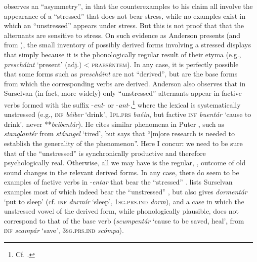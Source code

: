 \documentclass[output=paper,
modfonts
]{LSP/langsci}
\begin{document}
\citet[15]{anderson2013stem} observes an ``asymmetry'', in that the counterexamples
to his claim all involve the appearance of a ``stressed''  that does
not bear stress, while no examples exist in which an ``unstressed'' 
appears under stress. But this is not proof that that the 
alternants are sensitive to stress. On such evidence as Anderson
presents (and from \citealt{signorell2001a}), the small inventory of possibly
derived forms involving a stressed  displays that  simply
because it is the phonologically regular result of their etyma (e.g.,
\emph{prescháint} `present' (adj.) \textless{} \textsc{praeséntem}). In
any case, it is perfectly possible that some forms such as
\emph{prescháint} are not ``derived'', but are the base forms from which
the corresponding verbs are derived. Anderson also observes \citeyear[18]{anderson2013stem}
that in Surselvan (in fact, more widely) only ``unstressed'' 
alternants appear in factive verbs formed with the suffix -\emph{ent}-
or -\emph{ant}-,\footnote{Cf. \citet[103f.]{signorell1987a}.} where the
lexical  is systematically unstressed (e.g., \textsc{inf}
\emph{béiber} `drink', \textsc{1pl.prs} \emph{buéin}, but factive
\textsc{inf} \emph{buentár} `cause to drink', never **\emph{beibentár}).
He cites similar phenomena in Puter \citep[10]{anderson2013stem}, such as
\emph{stanglantér} from \emph{stáungel} `tired', but says that
``{[}m{]}ore research is needed to establish the generality of the
phenomenon''. Here I concur: we need to be sure that  of the
``unstressed''  is synchronically productive and therefore
psychologically real. Otherwise, all we may have is the regular,
, outcome of old sound changes in the relevant derived forms.
In any case, there do seem to be examples of factive verbs in
-\emph{entar} that bear the ``stressed''  . \citet[291f.]{jaberg1939a} lists Surselvan examples most of which indeed bear the
``unstressed'' , but also gives \emph{dormentár} `put to sleep'
(cf. \textsc{inf} \emph{durmír} `sleep', \textsc{1sg.prs.ind}
\emph{dorm}), and a case in which the unstressed vowel of the derived
form, while phonologically plausible, does not correspond to that of the
base verb (\emph{scumpentár} `cause to be saved, heal', from
\textsc{inf} \emph{scampár} `save', \textsc{3sg.prs.ind} \emph{scómpa}).
\end{document}
